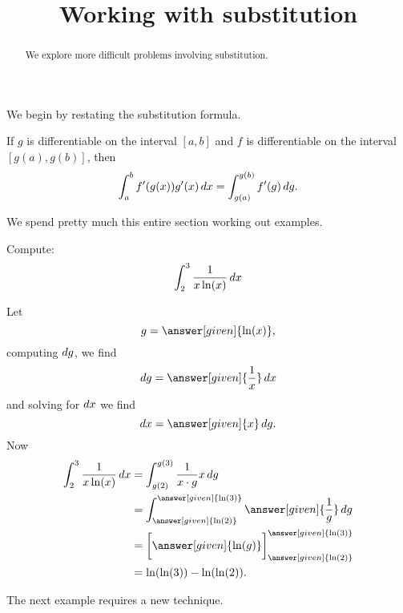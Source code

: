 \documentclass{ximera}
\title[Dig-In:]{Working with substitution}
\begin{document}
\begin{abstract}
We explore more difficult problems involving substitution.
\end{abstract}
\maketitle


We begin by restating the substitution formula.


\begin{theorem} 
If $g$ is differentiable on the interval $[a,b]$ and $f$ is
differentiable on the interval $[g(a),g(b)]$, then
\[
\int_a^b f'(g(x)) g'(x) \mathop{}\!d x =\int_{g(a)}^{g(b)} f'(g) \mathop{}\!d g.
\]
\end{theorem}

We spend pretty much this entire section working out examples.


\begin{example}
Compute:
\[
\int_{2}^{3} \frac{1}{x\ln(x)} \mathop{}\!d x
\]
\begin{explanation}
  Let
  \[
  g =\answer[given]{\ln(x)},
  \]
  computing $\mathop{}\!d g$, we find
  \[
  \d g =\answer[given]{\frac{1}{x}}\d x
  \]
  and solving for $\mathop{}\!d x$ we find
  \[
  \d x = \answer[given]{x} \d g.
  \]
  Now
\begin{align*}
\int_{2}^{3} \frac{1}{x\ln(x)} \d x &= \int_{g(2)}^{g(3)} \frac{1}{x \cdot g} x \d g  \\
&= \int_{\answer[given]{\ln(2)}}^{\answer[given]{\ln(3)}} \answer[given]{\frac{1}{g}} \d g\\
&= \eval{\answer[given]{\ln(g)}}_{\answer[given]{\ln(2)}}^{\answer[given]{\ln(3)}}\\
& = \ln(\ln(3)) - \ln(\ln(2)).
\end{align*}
\end{explanation}
\end{example}


The next example requires a new technique.
\end{document}
